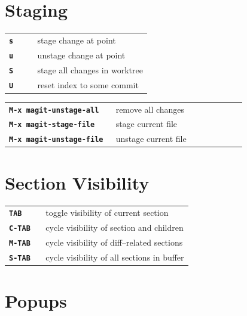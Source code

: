 \documentclass[9pt]{extarticle} %
\begin{document}
\begin{multicols}{3}
  \vspace{5ex}

  \section*{Staging}

  \begin{tabular}{L{0.20\linewidth} L{0.80\linewidth}}
    \tt \textbf{s} & stage change at point \\
    \tt \textbf{u} & unstage change at point \\
    \tt \textbf{S} & stage all changes in worktree \\
    \tt \textbf{U} & reset index to some commit
  \end{tabular}
  \begin{tabular}{L{0.45\linewidth} L{0.55\linewidth}}
    \tt \textbf{M-x magit-unstage-all} & remove all changes \\
    \tt \textbf{M-x magit-stage-file} & stage current file \\
    \tt \textbf{M-x magit-unstage-file} & unstage current file
  \end{tabular}

  \vspace{5ex}

  \section*{Section Visibility}

  \begin{tabular}{L{0.20\linewidth} L{0.80\linewidth}}
    \tt \textbf{TAB} & toggle visibility of current section \\
    \tt \textbf{C-TAB} & cycle visibility of section and children \\
    \tt \textbf{M-TAB} & cycle visibility of diff--related sections \\
    \tt \textbf{S-TAB} & cycle visibility of all sections in buffer
  \end{tabular}

  \columnbreak

  \section*{Popups}


\end{multicols}
\end{document}
